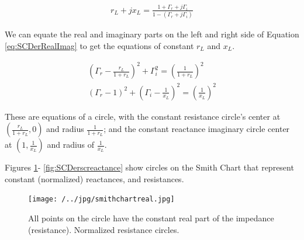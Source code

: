 \documentclass{ximera}
\begin{document}
\begin{eqnarray}
r_L + j x_L = \frac{ 1+\Gamma_r + j \Gamma_i}{1- (\Gamma_r + j \Gamma_i)} \label{eq:SCDerRealImag}
\end{eqnarray}

We can equate the real and imaginary parts on the left and right side of Equation \ref{eq:SCDerRealImag} to get the equations of constant $r_L$ and $x_L$.


\begin{eqnarray}
\left( \Gamma_r - \frac{r_L}{1+r_L}   \right)^2 + \Gamma_i^2  =\left( \frac{1}{1+r_L}   \right) ^2 \label{eq:SCDerRealCirc} \\
\left( \Gamma_r - 1   \right)^2 + \left(\Gamma_i - \frac{1}{x_L}    \right)^2  =\left( \frac{1}{x_L}   \right) ^2 \label{eq:SCDerImagCirc}
\end{eqnarray}

These are equations of a circle, with the constant resistance  circle's center at $(\frac{r_L}{1+r_L} ,0)$ and radius $\frac{1}{1+r_L} $; and the constant reactance imaginary circle center at $(1,\frac{1}{x_L})$ and radius of $ \frac{1}{x_L}  $.

Figures \ref{fig:SCDerscresistance}- \ref{fig:SCDerscreactance}  show circles on the Smith Chart that represent constant (normalized) reactances, and resistances. 
\begin{figure}[htbp]
\begin{center}
\texttt{[image: /../jpg/smithchartreal.jpg]}
\end{center}
\caption{All points on the circle have the constant real part of the impedance (resistance). Normalized resistance circles.}
\label{fig:SCDerscresistance}
\end{figure}
\end{document}
